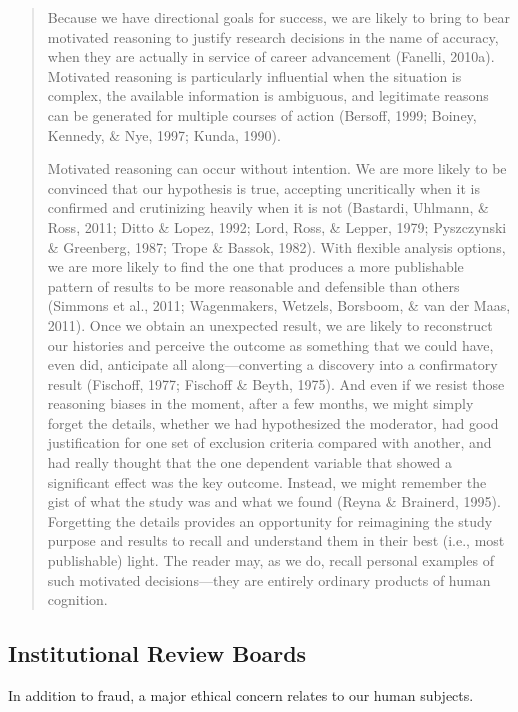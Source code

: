 \documentclass[12pt] {article}
\begin{document}
\begin{quote}
Because we have directional goals for success, we are likely to bring to
bear motivated reasoning to justify research decisions in the name of
accuracy, when they are actually in service of career advancement
(Fanelli, 2010a). Motivated reasoning is particularly influential when
the situation is complex, the available information is ambiguous, and
legitimate reasons can be generated for multiple courses of action
(Bersoff, 1999; Boiney, Kennedy, \& Nye, 1997; Kunda, 1990).

Motivated reasoning can occur without intention. We are more likely to
be convinced that our hypothesis is true, accepting uncritically when it
is confirmed and crutinizing heavily when it is not (Bastardi, Uhlmann,
\& Ross, 2011; Ditto \& Lopez, 1992; Lord, Ross, \& Lepper, 1979;
Pyszczynski \& Greenberg, 1987; Trope \& Bassok, 1982). With flexible
analysis options, we are more likely to find the one that produces a
more publishable pattern of results to be more reasonable and defensible
than others (Simmons et al., 2011; Wagenmakers, Wetzels, Borsboom, \&
van der Maas, 2011). Once we obtain an unexpected result, we are likely
to reconstruct our histories and perceive the outcome as something that
we could have, even did, anticipate all along---converting a discovery
into a confirmatory result (Fischoff, 1977; Fischoff \& Beyth, 1975).
And even if we resist those reasoning biases in the moment, after a few
months, we might simply forget the details, whether we had hypothesized
the moderator, had good justification for one set of exclusion criteria
compared with another, and had really thought that the one dependent
variable that showed a significant effect was the key outcome. Instead,
we might remember the gist of what the study was and what we found
(Reyna \& Brainerd, 1995). Forgetting the details provides an
opportunity for reimagining the study purpose and results to recall and
understand them in their best (i.e., most publishable) light. The reader
may, as we do, recall personal examples of such motivated
decisions---they are entirely ordinary products of human cognition.
\end{quote}

\subsection{Institutional Review
Boards}\label{institutional-review-boards}

In addition to fraud, a major ethical concern relates to our human
subjects.
\end{document}
